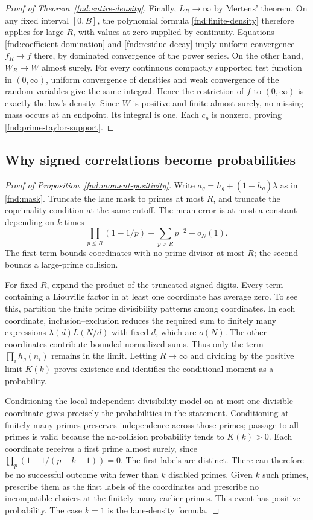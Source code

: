 \begin{proof}[Proof of Theorem~\ref{fnd:entire-density}]
Finally, $L_R\to\infty$ by Mertens' theorem.  On any fixed
interval $[0,B]$, the polynomial formula
\eqref{fnd:finite-density} therefore applies for large $R$,
with values at zero supplied by continuity.  Equations
\eqref{fnd:coefficient-domination} and
\eqref{fnd:residue-decay} imply uniform convergence $f_R\to f$
there, by dominated convergence of the power series.
On the other hand, $W_R\to W$ almost surely.  For every continuous
compactly supported test function in $(0,\infty)$, uniform
convergence of densities and weak convergence of the random
variables give the same integral.  Hence the restriction of $f$
to $(0,\infty)$ is exactly the law's density.  Since $W$ is
positive and finite almost surely, no missing mass occurs at an
endpoint.  Its integral is one.  Each $c_p$ is nonzero, proving
\eqref{fnd:prime-taylor-support}.
\end{proof}

\subsection{Why signed correlations become probabilities}\label{app:correlations}
\begin{proof}[Proof of Proposition~\ref{fnd:moment-positivity}]
Write $a_g=h_g+(1-h_g)\lambda$ as in
\eqref{fnd:mask}.  Truncate the lane mask to primes at most $R$,
and truncate the coprimality condition at the same cutoff.  The
mean error is at most a constant depending on $k$ times
\[
 \prod_{p\le R}(1-1/p)+\sum_{p>R}p^{-2}+o_N(1).
\]
The first term bounds coordinates with no prime divisor at most
$R$; the second bounds a large-prime collision.

For fixed $R$, expand the product of the truncated signed digits.
Every term containing a Liouville factor in at least one coordinate
has average zero.  To see this, partition the finite prime
divisibility patterns among coordinates.  In each coordinate,
inclusion--exclusion reduces the required sum to finitely many
expressions $\lambda(d)L(N/d)$ with fixed $d$, which are $o(N)$.
The other coordinates contribute bounded normalized sums.  Thus
only the term $\prod_i h_g(n_i)$ remains in the limit.
Letting $R\to\infty$ and dividing by the positive limit $K(k)$
proves existence and identifies the conditional moment as a
probability.

Conditioning the local independent divisibility model on at most
one divisible coordinate gives precisely the probabilities in the
statement.  Conditioning at finitely many primes preserves
independence across those primes; passage to all primes is valid
because the no-collision probability tends to $K(k)>0$.
Each coordinate receives a first prime almost surely, since
$\prod_p(1-1/(p+k-1))=0$.  The first labels are distinct.
There can therefore be no successful outcome with fewer than $k$
disabled primes.  Given $k$ such primes, prescribe them as the
first labels of the coordinates and prescribe no incompatible
choices at the finitely many earlier primes.  This event has
positive probability.  The case $k=1$ is the lane-density formula.
\end{proof}
